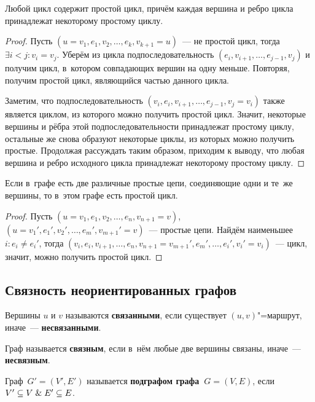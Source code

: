 \begin{lemma}
\label{lemma:cycle_contains_simple_one}
Любой цикл содержит простой цикл, причём каждая вершина и ребро цикла принадлежат некоторому простому циклу.
\end{lemma}
\begin{proof}
Пусть $(u = v_1, e_1, v_2, \ldots, e_k, v_{k+1} = u)$~--- не простой цикл, тогда $\exists i < j \colon v_i = v_j$.
Уберём из цикла подпоследовательность $(e_i, v_{i+1}, \ldots, e_{j-1}, v_j)$ и получим цикл, в~котором совпадающих вершин на одну меньше.
Повторяя, получим простой цикл, являющийся частью данного цикла.

Заметим, что подпоследовательность $(v_i, e_i, v_{i+1}, \ldots, e_{j-1}, v_j = v_i)$ также является циклом, из которого можно получить простой цикл.
Значит, некоторые вершины и рёбра этой подпоследовательности принадлежат простому циклу, остальные же снова образуют некоторые циклы, из которых можно получить простые.
Продолжая рассуждать таким образом, приходим к выводу, что любая вершина и ребро исходного цикла принадлежат некоторому простому циклу.
\end{proof}
	
\begin{lemma}
\label{lemma:existence_of_simple_cycle}
Если в~графе есть две различные простые цепи, соединяющие одни и те~же вершины, то в~этом графе есть простой цикл.
\end{lemma}
\begin{proof}
Пусть $(u = v_1, e_1, v_2, \ldots, e_n, v_{n+1} = v)$, $(u = v_1', e_1', v_2', \ldots, e_m', v_{m+1}' = v)$~--- простые цепи.
Найдём наименьшее~$i \colon e_i \neq e_i'$, тогда $(v_i, e_i, v_{i+1}, \ldots, e_n, v_{n+1} = v_{m+1}', e_m', \ldots, e_i', v_i' = v_i)$~--- цикл, значит, можно получить простой цикл.
\end{proof}

\subsection{Связность неориентированных графов}
Вершины $u$ и $v$ называются \textbf{связанными}, если существует $(u, v)$"=маршрут, иначе~--- \textbf{несвязанными}.

 Граф называется \textbf{связным}, если в~нём любые две вершины связаны, иначе~--- \textbf{несвязным}.

Граф~$G' = (V', E')$ называется \textbf{подграфом графа~$G = (V, E)$}, если $V' \subseteq V \mathrel{\&} E' \subseteq E$.

